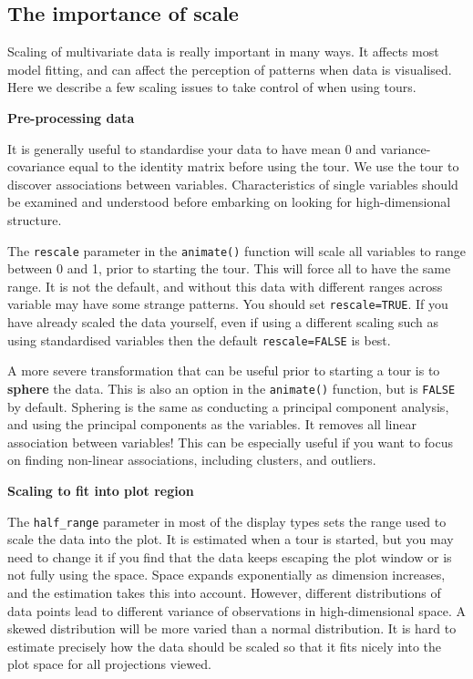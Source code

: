 \documentclass[
  letterpaper,
]{krantz}
\begin{document}
\subsection{The importance of scale}\label{the-importance-of-scale}

Scaling of multivariate data is really important in many ways. It
affects most model fitting, and can affect the perception of patterns
when data is visualised. Here we describe a few scaling issues to take
control of when using tours.

\textbf{Pre-processing data}

It is generally useful to standardise your data to have mean 0 and
variance-covariance equal to the identity matrix before using the tour.
We use the tour to discover associations between variables.
Characteristics of single variables should be examined and understood
before embarking on looking for high-dimensional structure.

The \texttt{rescale} parameter in the \texttt{animate()} function will
scale all variables to range between 0 and 1, prior to starting the
tour. This will force all to have the same range. It is not the default,
and without this data with different ranges across variable may have
some strange patterns. You should set \texttt{rescale=TRUE}. If you have
already scaled the data yourself, even if using a different scaling such
as using standardised variables then the default \texttt{rescale=FALSE}
is best.

A more severe transformation that can be useful prior to starting a tour
is to \textbf{sphere} the data. This is also an option in the
\texttt{animate()} function, but is \texttt{FALSE} by default. Sphering
is the same as conducting a principal component analysis, and using the
principal components as the variables. It removes all linear association
between variables! This can be especially useful if you want to focus on
finding non-linear associations, including clusters, and outliers.

\textbf{Scaling to fit into plot region}

The \texttt{half\_range} parameter in most of the display types sets the
range used to scale the data into the plot. It is estimated when a tour
is started, but you may need to change it if you find that the data
keeps escaping the plot window or is not fully using the space. Space
expands exponentially as dimension increases, and the estimation takes
this into account. However, different distributions of data points lead
to different variance of observations in high-dimensional space. A
skewed distribution will be more varied than a normal distribution. It
is hard to estimate precisely how the data should be scaled so that it
fits nicely into the plot space for all projections viewed.
\end{document}
